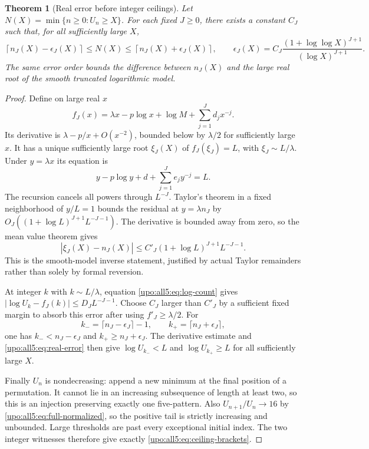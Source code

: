 \documentclass[11pt,letterpaper]{article}
\newtheorem{theorem}{Theorem}[section]
\theoremstyle{remark}\newtheorem{remark}[theorem]{Remark}
\numberwithin{equation}{section}
\begin{document}
\begin{theorem}[Real error before integer ceilings]\label{upo:all5:thm:inverse}
Let $N(X)=\min\{n\ge0:U_n\ge X\}$. For each fixed $J\ge0$,
there exists a constant $C_J$ such that, for all sufficiently large
$X$,
\begin{equation}\label{upo:all5:eq:ceiling-brackets}
 \left\lceil n_J(X)-\epsilon_J(X)\right\rceil
   \le N(X)\le
 \left\lceil n_J(X)+\epsilon_J(X)\right\rceil,
 \qquad
 \epsilon_J(X)=C_J\frac{(1+\log\log X)^{J+1}}{(\log X)^{J+1}}.
\end{equation}
The same error order bounds the difference between $n_J(X)$ and
the large real root of the smooth truncated logarithmic model.
\end{theorem}
\begin{proof}
Define on large real $x$
\[
 f_J(x)=\lambda x-p\log x+\log M+\sum_{j=1}^Jd_jx^{-j}.
\]
Its derivative is $\lambda-p/x+O(x^{-2})$, bounded below by
$\lambda/2$ for sufficiently large $x$. It has a unique sufficiently
large root $\xi_J(X)$ of $f_J(\xi_J)=L$, with $\xi_J\sim L/\lambda$.
Under $y=\lambda x$ its equation is
\[
 y-p\log y+d+\sum_{j=1}^Je_jy^{-j}=L.
\]
The recursion cancels all powers through $L^{-J}$. Taylor's theorem
in a fixed neighborhood of $y/L=1$ bounds the residual at
$y=\lambda n_J$ by
$O_J((1+\log L)^{J+1}L^{-J-1})$.
The derivative is bounded away from zero, so the mean value theorem
gives
\begin{equation}\label{upo:all5:eq:real-error}
 |\xi_J(X)-n_J(X)|
                  \le C'_J(1+\log L)^{J+1}L^{-J-1}.
\end{equation}
This is the smooth-model inverse statement, justified by actual
Taylor remainders rather than solely by formal reversion.

At integer $k$ with $k\sim L/\lambda$, equation
\eqref{upo:all5:eq:log-count} gives
$|\log U_k-f_J(k)|\le D_JL^{-J-1}$. Choose $C_J$ larger than
$C'_J$ by a sufficient fixed margin to absorb this error after
using $f'_J\ge\lambda/2$. For
\[
 k_- =\lceil n_J-\epsilon_J\rceil-1,
 \qquad k_+ =\lceil n_J+\epsilon_J\rceil,
\]
one has $k_-<n_J-\epsilon_J$ and $k_+\ge n_J+\epsilon_J$.
The derivative estimate and \eqref{upo:all5:eq:real-error} then give
$\log U_{k_-}<L$ and $\log U_{k_+}\ge L$ for all sufficiently
large $X$.

Finally $U_n$ is nondecreasing: append a new minimum at the final
position of a permutation. It cannot lie in an increasing
subsequence of length at least two, so this is an injection
preserving exactly one five-pattern. Also
$U_{n+1}/U_n\to16$ by \eqref{upo:all5:eq:full-normalized}, so the positive
tail is strictly increasing and unbounded. Large thresholds are
past every exceptional initial index. The two integer witnesses
therefore give exactly \eqref{upo:all5:eq:ceiling-brackets}.
\end{proof}
\end{document}
